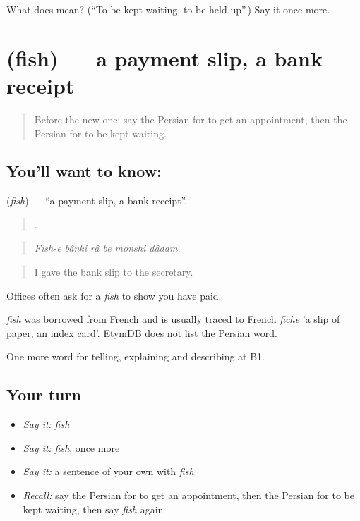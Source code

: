 \begin{tcolorbox}[breakable,colback=teal!4,colframe=teal!35!black,title={Before you move on}]
What does   mean? (\textquotedblleft{}To be kept waiting, to be held up\textquotedblright{}.) Say it once more.
\end{tcolorbox}
\section[\texorpdfstring{\fa{فیش} (fish)}{فیش (fish)}]{ (fish) — a payment slip, a bank receipt}

\label{lesson:FA-C452-fish}



\begin{quote}
Before the new one: say the Persian for to get an appointment, then the Persian for to be kept waiting.
\end{quote}

\subsection*{You'll want to know: }
\textbf{} (\emph{fish}) — \textquotedblleft{}a payment slip, a bank receipt\textquotedblright{}.

\begin{quote}
     .
\end{quote}

\begin{quote}
\emph{Fish-e bânki râ be monshi dâdam.}
\end{quote}

\begin{quote}
I gave the bank slip to the secretary.
\end{quote}

Offices often ask for a \emph{fish} to show you have paid.

\begin{cousinweb}
\emph{fish} was borrowed from French and is usually traced to French \emph{fiche} 'a slip of paper, an index card'. EtymDB does not list the Persian word.
\end{cousinweb}

\begin{grammarlens}[title={What you've built}]
One more word for telling, explaining and describing at B1.
\end{grammarlens}

\subsection*{Your turn}
\begin{itemize}
\raggedright
  \item \emph{Say it:} \emph{fish}
  \item \emph{Say it:} \emph{fish}, once more
  \item \emph{Say it:} a sentence of your own with \emph{fish}
  \item \emph{Recall:} say the Persian for to get an appointment, then the Persian for to be kept waiting, then say \emph{fish} again
\end{itemize}

